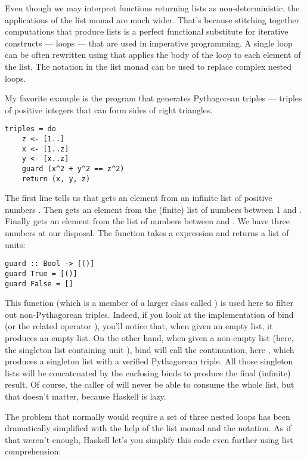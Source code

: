 Even though we may interpret functions returning lists as
non-deterministic, the applications of the list monad are much wider.
That's because stitching together computations that produce lists is a
perfect functional substitute for iterative constructs --- loops ---
that are used in imperative programming. A single loop can be often
rewritten using  that applies the body of the loop to each
element of the list. The  notation in the list monad can be
used to replace complex nested loops.

My favorite example is the program that generates Pythagorean triples
--- triples of positive integers that can form sides of right triangles.

\begin{Verbatim}[commandchars=\\\{\}]
triples = do
    z <- [1..]
    x <- [1..z]
    y <- [x..z]
    guard (x^2 + y^2 == z^2)
    return (x, y, z)
\end{Verbatim}
The first line tells us that  gets an element from an infinite
list of positive numbers \code{{[}1..{]}}. Then  gets an
element from the (finite) list \code{{[}1..z{]}} of numbers between 1
and . Finally  gets an element from the list of
numbers between  and . We have three numbers
 at our
disposal. The function  takes a  expression
and returns a list of units:

\begin{Verbatim}[commandchars=\\\{\}]
guard :: Bool -> [()]
guard True = [()]
guard False = []
\end{Verbatim}
This function (which is a member of a larger class called
) is used here to filter out non-Pythagorean triples.
Indeed, if you look at the implementation of bind (or the related
operator \code{>>}), you'll notice that,
when given an empty list, it produces an empty list. On the other hand,
when given a non-empty list (here, the singleton list containing unit
\code{{[}(){]}}), bind will call the continuation, here
, which produces a singleton list with a
verified Pythagorean triple. All those singleton lists will be
concatenated by the enclosing binds to produce the final (infinite)
result. Of course, the caller of  will never be able to
consume the whole list, but that doesn't matter, because Haskell is
lazy.

The problem that normally would require a set of three nested loops has
been dramatically simplified with the help of the list monad and the
 notation. As if that weren't enough, Haskell let's you
simplify this code even further using list comprehension:

